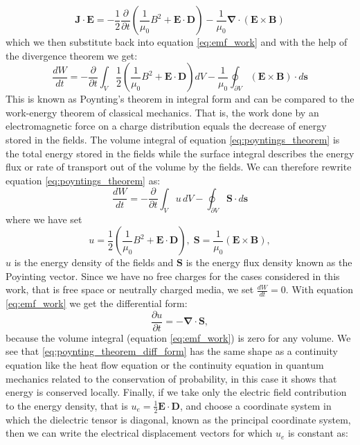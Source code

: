 \begin{equation}
    \bm{J}\cdot\bm{E} = -\frac{1}{2}\frac{\partial}{\partial t}\left(\frac{1}{\mu_0}B^2+\bm{E}\cdot\bm{D}\right)-\frac{1}{\mu_0}\bm{\nabla}\cdot(\bm{E}\times\bm{B})
\end{equation}
which we then substitute back into equation \ref{eq:emf_work} and with the help of the divergence theorem we get:
\begin{equation}
    \label{eq:poyntings_theorem}
    \frac{dW}{dt} = -\frac{\partial}{\partial t} \int_V \frac{1}{2}\left(\frac{1}{\mu_0}B^2+\bm{E}\cdot\bm{D}\right)dV -\frac{1}{\mu_0}\oint_{\partial V} (\bm{E}\times\bm{B}) \cdot d\bm{s}
\end{equation}
This is known as Poynting's theorem in integral form and can be compared to the work-energy theorem of classical mechanics. That is, the work done by an electromagnetic force on a charge distribution equals the decrease of energy stored in the fields. The volume integral of equation \ref{eq:poyntings_theorem} is the total energy stored in the fields while the surface integral describes the energy flux or rate of transport out of the volume by the fields. We can therefore rewrite equation \ref{eq:poyntings_theorem} as:
\begin{equation}
    \frac{dW}{dt} = -\frac{\partial}{\partial t} \int_V u\, dV -\oint_{\partial V} \bm{S} \cdot d\bm{s}
\end{equation}
where we have set
\begin{equation}
    u = \frac{1}{2}\left(\frac{1}{\mu_0}B^2+\bm{E}\cdot\bm{D}\right),\; \bm{S} = \frac{1}{\mu_0}(\bm{E}\times\bm{B}),
\end{equation}
$u$ is the energy density of the fields and $\bm{S}$ is the energy flux density known as the Poyinting vector. Since we have no free charges for the cases considered in this work, that is free space or neutrally charged media, we set $\frac{dW}{dt}=0$. With equation \ref{eq:emf_work} we get the differential form:
\begin{equation}
    \label{eq:poynting_theorem_diff_form}
    \frac{\partial u}{\partial t} = -\bm{\nabla} \cdot \bm{S},
\end{equation}
because the volume integral (equation \ref{eq:emf_work}) is zero for any volume. We see that \ref{eq:poynting_theorem_diff_form} has the same shape as a continuity equation like the heat flow equation or the continuity equation in quantum mechanics related to the conservation of probability, in this case it shows that energy is conserved locally. Finally, if we take only the electric field contribution to the energy density, that is $u_e = \frac{1}{2}\bm{E}\cdot\bm{D}$, and choose a coordinate system in which the dielectric tensor is diagonal, known as the principal coordinate system, then we can write the electrical displacement vectors for which $u_e$ is constant as:

